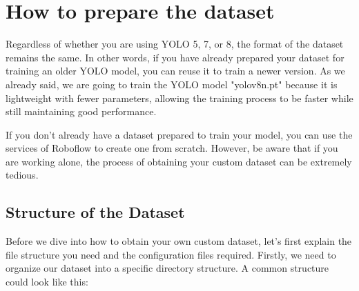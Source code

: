 \documentclass[../main]{subfiles}
\begin{document}
\section{How to prepare the dataset}
Regardless of whether you are using YOLO 5, 7, or 8, the format of the dataset remains the same. In other words, if you have already prepared your dataset for training an older YOLO model, you can reuse it to train a newer version. As we already said, we are going to train the YOLO model "yolov8n.pt" because it is lightweight with fewer parameters, allowing the training process to be faster while still maintaining good performance.

If you don't already have a dataset prepared to train your model, you can use the services of Roboflow to create one from scratch. However, be aware that if you are working alone, the process of obtaining your custom dataset can be extremely tedious.

\subsection{Structure of the Dataset}
Before we dive into how to obtain your own custom dataset, let's first explain the file structure you need and the configuration files required. Firstly, we need to organize our dataset into a specific directory structure. A common structure could look like this:
\end{document}
